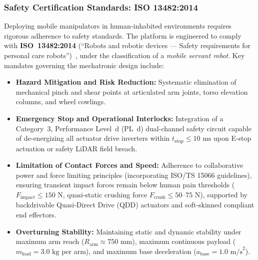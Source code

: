 \subsubsection{Safety Certification Standards: ISO 13482:2014}
Deploying mobile manipulators in human-inhabited environments requires rigorous adherence to safety standards. The platform is engineered to comply with \textbf{ISO~13482:2014} (``Robots and robotic devices --- Safety requirements for personal care robots'')~\cite{iso13482}, under the classification of a \emph{mobile servant robot}. Key mandates governing the mechatronic design include:
\begin{itemize}[leftmargin=1.5em]
  \item \textbf{Hazard Mitigation and Risk Reduction:} Systematic elimination of mechanical pinch and shear points at articulated arm joints, torso elevation columns, and wheel cowlings.
  \item \textbf{Emergency Stop and Operational Interlocks:} Integration of a Category~3, Performance Level~d (PL~d) dual-channel safety circuit capable of de-energizing all actuator drive inverters within $t_{\text{stop}} \le 10\text{ ms}$ upon E-stop actuation or safety LiDAR field breach.
  \item \textbf{Limitation of Contact Forces and Speed:} Adherence to collaborative power and force limiting principles (incorporating ISO/TS 15066 guidelines), ensuring transient impact forces remain below human pain thresholds ($F_{\text{impact}} \le 150\text{ N}$, quasi-static crushing force $F_{\text{crush}} \le 50\text{--}75\text{ N}$), supported by backdrivable Quasi-Direct Drive (QDD) actuators and soft-skinned compliant end effectors.
  \item \textbf{Overturning Stability:} Maintaining static and dynamic stability under maximum arm reach ($R_{\text{arm}} \approx 750\text{ mm}$), maximum continuous payload ($m_{\text{load}} = 3.0\text{ kg}$ per arm), and maximum base deceleration ($a_{\text{base}} = 1.0\text{ m/s}^2$).
\end{itemize}


